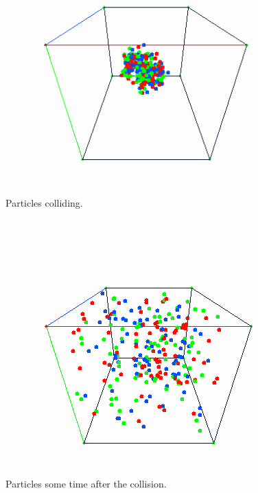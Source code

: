 \documentclass{article}
\begin{document}
\begin{multicols}{2}


\begin{figure}
\centering
\includegraphics[width=\linewidth]{./imgs/particlesduring}
\caption{Particles colliding.}
\label{fig:partduring}
\end{figure}

\begin{figure}
\centering
\includegraphics[width=\linewidth]{./imgs/particlesafter}
\caption{Particles some time after the collision.}
\label{fig:partafter}
\end{figure}



\end{multicols}
\end{document}
